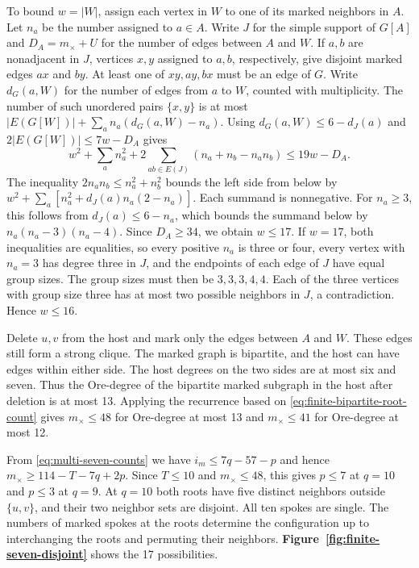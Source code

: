 \documentclass[preprint,11pt,numbers]{elsarticle-arxiv}
\numberwithin{equation}{section}
\theoremstyle{definition}
\begin{document}
To bound $w=|W|$, assign each vertex in $W$ to one of its
marked neighbors in $A$. Let $n_a$ be the number assigned
to $a\in A$. Write $J$ for the simple support of $G[A]$
and $D_A=m_\times+U$ for the number of edges between $A$
and $W$. If $a,b$ are nonadjacent in $J$, vertices $x,y$
assigned to $a,b$, respectively, give disjoint marked edges
$ax$ and $by$. At least one of $xy,ay,bx$ must be an edge of $G$. Write $d_G(a,W)$ for the number of edges from $a$ to $W$,
counted with multiplicity. The number of such unordered pairs
$\{x,y\}$ is at most $|E(G[W])|+\sum_a n_a(d_G(a,W)-n_a)$. Using
$d_G(a,W)\le6-d_J(a)$ and $2|E(G[W])|\le7w-D_A$ gives
\[
 w^2+\sum_a n_a^2+2\sum_{ab\in E(J)}(n_a+n_b-n_an_b)
 \le 19w-D_A.
\]
The inequality $2n_an_b\le n_a^2+n_b^2$ bounds the
left side from below by $w^2+\sum_a[n_a^2+d_J(a)n_a(2-n_a)]$.
Each summand is nonnegative. For $n_a\ge3$, this follows
from $d_J(a)\le6-n_a$, which bounds the summand below
by $n_a(n_a-3)(n_a-4)$. Since $D_A\ge34$, we obtain
$w\le17$. If $w=17$, both inequalities are equalities, so
every positive $n_a$ is three or four, every vertex with
$n_a=3$ has degree three in $J$, and the endpoints of each
edge of $J$ have equal group sizes. The group sizes must
then be $3,3,3,4,4$. Each of the three vertices with group
size three has at most two possible neighbors in $J$, a
contradiction. Hence $w\le16$.

Delete $u,v$ from the host and mark only the edges between
$A$ and $W$. These edges still form a strong clique. The
marked graph is bipartite, and the host can have edges within
either side. The host degrees on the two sides are at most
six and seven. Thus the Ore-degree of the bipartite marked
subgraph in the host after deletion is at most 13.
Applying the recurrence based on \eqref{eq:finite-bipartite-root-count}
gives $m_\times\le48$ for Ore-degree at most 13 and
$m_\times\le41$ for Ore-degree at most 12.

From \eqref{eq:multi-seven-counts} we have $i_m\leq7q-57-p$ and hence
$m_\times\geq114-T-7q+2p$. Since $T\leq10$ and $m_\times\leq48$, this
gives $p\le7$ at $q=10$ and $p\le3$ at $q=9$. At $q=10$ both roots
have five distinct neighbors outside $\{u,v\}$, and their two neighbor
sets are disjoint. All ten spokes are single. The numbers of marked
spokes at the roots determine the configuration up to interchanging
the roots and permuting their neighbors.
\textbf{Figure~\ref{fig:finite-seven-disjoint}} shows the 17 possibilities.
\end{document}
